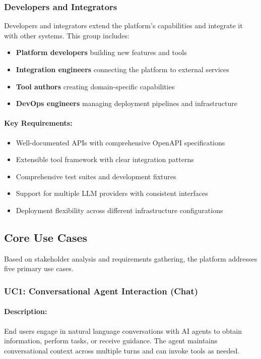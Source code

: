 \documentclass[a4paper,twoside]{sapthesis}
\begin{document}
\subsubsection{Developers and Integrators}

Developers and integrators extend the platform's capabilities and integrate it with other systems. This group includes:

\begin{itemize}
    \item \textbf{Platform developers} building new features and tools
    \item \textbf{Integration engineers} connecting the platform to external services
    \item \textbf{Tool authors} creating domain-specific capabilities
    \item \textbf{DevOps engineers} managing deployment pipelines and infrastructure
\end{itemize}

\paragraph{Key Requirements:}
\begin{itemize}
    \item Well-documented APIs with comprehensive OpenAPI specifications
    \item Extensible tool framework with clear integration patterns
    \item Comprehensive test suites and development fixtures
    \item Support for multiple LLM providers with consistent interfaces
    \item Deployment flexibility across different infrastructure configurations
\end{itemize}

\subsection{Core Use Cases}

Based on stakeholder analysis and requirements gathering, the platform addresses five primary use cases.

\subsubsection{UC1: Conversational Agent Interaction (Chat)}

\paragraph{Description:} End users engage in natural language conversations with AI agents to obtain information, perform tasks, or receive guidance. The agent maintains conversational context across multiple turns and can invoke tools as needed.
\end{document}

